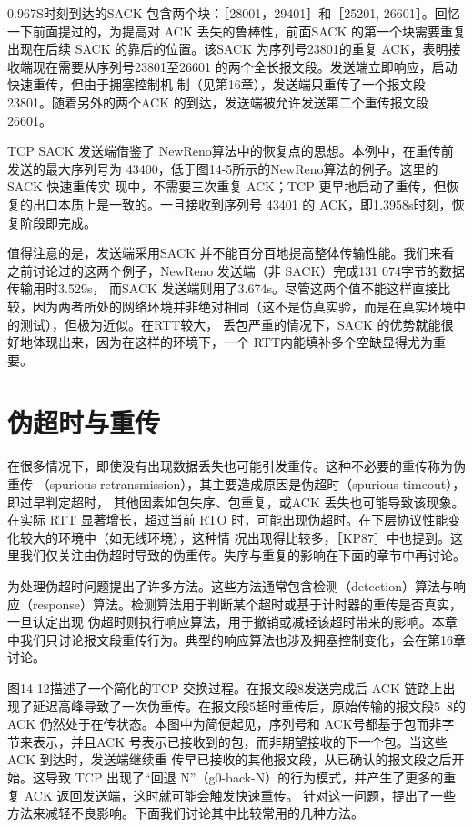 0.967S时刻到达的SACK 包含两个块：［28001，29401］和［25201, 26601］。回忆一下前面提过的，为提高对 ACK 丢失的鲁棒性，前面SACK 的第一个块需要重复出现在后续
SACK 的靠后的位置。该SACK 为序列号23801的重复 ACK，表明接收端现在需要从序列号23801至26601 的两个全长报文段。发送端立即响应，启动快速重传，但由于拥塞控制机
制（见第16章），发送端只重传了一个报文段23801。随着另外的两个ACK 的到达，发送端被允许发送第二个重传报文段26601。

TCP SACK 发送端借鉴了 NewReno算法中的恢复点的思想。本例中，在重传前发送的最大序列号为 43400，低于图14-5所示的NewReno算法的例子。这里的SACK 快速重传实
现中，不需要三次重复 ACK；TCP 更早地启动了重传，但恢复的出口本质上是一致的。一且接收到序列号 43401 的 ACK，即1.3958s时刻，恢复阶段即完成。

值得注意的是，发送端采用SACK 并不能百分百地提高整体传输性能。我们来看之前讨论过的这两个例子，NewReno 发送端（非 SACK）完成131 074字节的数据传输用时3.529s，
而SACK 发送端则用了3.674s。尽管这两个值不能这样直接比较，因为两者所处的网络环境并非绝对相同（这不是仿真实验，而是在真实环境中的测试），但极为近似。在RTT较大，
丢包严重的情况下，SACK 的优势就能很好地体现出来，因为在这样的环境下，一个 RTT内能填补多个空缺显得尤为重要。

\section{伪超时与重传}
在很多情况下，即使没有出现数据丢失也可能引发重传。这种不必要的重传称为伪重传 （spurious retransmission），其主要造成原因是伪超时（spurious timeout），即过早判定超时，
其他因素如包失序、包重复，或ACK 丢失也可能导致该现象。在实际 RTT 显著增长，超过当前 RTO 时，可能出现伪超时。在下层协议性能变化较大的环境中（如无线环境），这种情
况出现得比较多，［KP87］中也提到。这里我们仅关注由伪超时导致的伪重传。失序与重复的影响在下面的章节中再讨论。

为处理伪超时问题提出了许多方法。这些方法通常包含检测（detection）算法与响应（response）算法。检测算法用于判断某个超时或基于计时器的重传是否真实，一旦认定出现
伪超时则执行响应算法，用于撤销或减轻该超时带来的影响。本章中我们只讨论报文段重传行为。典型的响应算法也涉及拥塞控制变化，会在第16章讨论。

图14-12描述了一个简化的TCP 交换过程。在报文段8发送完成后 ACK 链路上出现了延迟高峰导致了一次伪重传。在报文段5超时重传后，原始传输的报文段5~8的ACK
仍然处于在传状态。本图中为简便起见，序列号和 ACK号都基于包而非字节来表示，并且ACK 号表示已接收到的包，而非期望接收的下一个包。当这些 ACK 到达时，发送端继续重
传早已接收的其他报文段，从已确认的报文段之后开始。这导致 TCP 出现了“回退 N”（g0-back-N）的行为模式，并产生了更多的重复 ACK 返回发送端，这时就可能会触发快速重传。
针对这一问题，提出了一些方法来减轻不良影响。下面我们讨论其中比较常用的几种方法。

